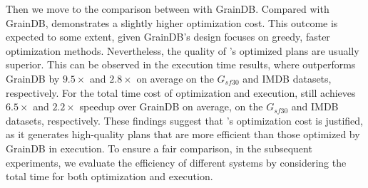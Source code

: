 Then we move to the comparison between \name with GrainDB. Compared with GrainDB, \name demonstrates a slightly higher optimization cost. This outcome is expected to some extent, given GrainDB's design focuses on greedy, faster optimization methods.
Nevertheless, the quality of \name's optimized plans are usually superior. This can be observed in the execution time results, where \name outperforms GrainDB by $9.5\times$ and $2.8\times$ on average on the $G_{sf30}$ and IMDB datasets, respectively.
For the total time cost of optimization and execution, \name still achieves $6.5\times$ and $2.2\times$ speedup over GrainDB on average, on the $G_{sf30}$ and IMDB datasets, respectively.
These findings suggest that \name's optimization cost is justified, as it generates high-quality plans that are more efficient than those optimized by GrainDB in execution.
To ensure a fair comparison, in the subsequent experiments, we evaluate the efficiency of different systems by considering the total time for both optimization and execution.


